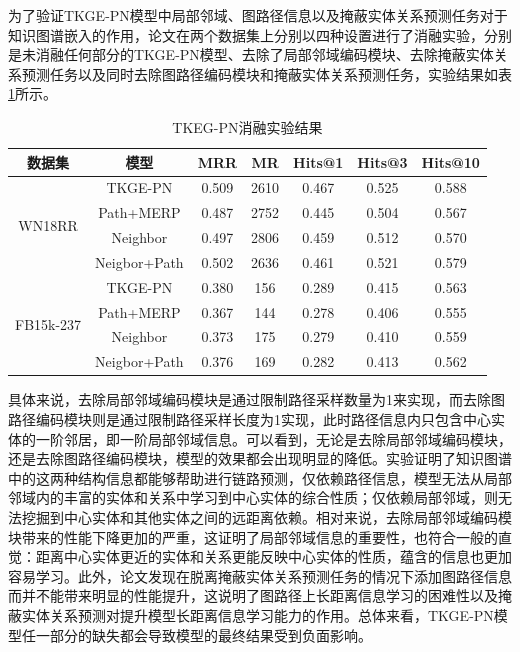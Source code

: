 为了验证TKGE-PN模型中局部邻域、图路径信息以及掩蔽实体关系预测任务对于知识图谱嵌入的作用，论文在两个数据集上分别以四种设置进行了消融实验，分别是未消融任何部分的TKGE-PN模型、去除了局部邻域编码模块、去除掩蔽实体关系预测任务以及同时去除图路径编码模块和掩蔽实体关系预测任务，实验结果如表\ref{ablation_tab}所示。

\begin{table}[htbp]
    \begin{center}
        \caption{TKEG-PN消融实验结果}
        \setlength{\tabcolsep}{10pt}
        \renewcommand{\arraystretch}{1.5}
        \begin{tabular}{*{7}{c}}
            \toprule
            数据集 & 模型 & MRR&MR&Hits@1&Hits@3&	Hits@10\\
            \midrule
            \multirow{4}{*}{WN18RR}&TKGE-PN&0.509&2610&0.467&0.525&0.588\\
            &Path+MERP&0.487&2752&0.445&0.504&0.567\\
            &Neighbor&0.497&2806&0.459&0.512&0.570\\
            &Neigbor+Path&0.502&2636&0.461&0.521&0.579\\
            \cmidrule{1-7}
            \multirow{4}{*}{FB15k-237}&TKGE-PN&0.380&156&0.289&0.415&0.563\\
            &Path+MERP&0.367&144&0.278&0.406&0.555\\
            &Neighbor&0.373&175&0.279&0.410&0.559\\
            &Neigbor+Path&0.376&169&0.282&0.413&0.562\\
            \bottomrule
        \end{tabular}
        \label{ablation_tab}
    \end{center}
\end{table}

具体来说，去除局部邻域编码模块是通过限制路径采样数量为1来实现，而去除图路径编码模块则是通过限制路径采样长度为1实现，此时路径信息内只包含中心实体的一阶邻居，即一阶局部邻域信息。可以看到，无论是去除局部邻域编码模块，还是去除图路径编码模块，模型的效果都会出现明显的降低。实验证明了知识图谱中的这两种结构信息都能够帮助进行链路预测，仅依赖路径信息，模型无法从局部邻域内的丰富的实体和关系中学习到中心实体的综合性质；仅依赖局部邻域，则无法挖掘到中心实体和其他实体之间的远距离依赖。相对来说，去除局部邻域编码模块带来的性能下降更加的严重，这证明了局部邻域信息的重要性，也符合一般的直觉：距离中心实体更近的实体和关系更能反映中心实体的性质，蕴含的信息也更加容易学习。此外，论文发现在脱离掩蔽实体关系预测任务的情况下添加图路径信息而并不能带来明显的性能提升，这说明了图路径上长距离信息学习的困难性以及掩蔽实体关系预测对提升模型长距离信息学习能力的作用。总体来看，TKGE-PN模型任一部分的缺失都会导致模型的最终结果受到负面影响。

